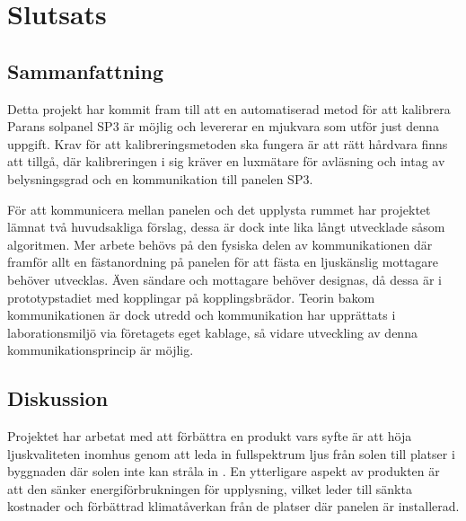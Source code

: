\section{Slutsats} %
\label{sec:slutsats}
    \subsection{Sammanfattning} %
    \label{sub:sammanfattning}
        Detta projekt har kommit fram till att en automatiserad metod för att kalibrera Parans solpanel SP3 är möjlig och levererar en mjukvara som utför just denna uppgift. Krav för att kalibreringsmetoden ska fungera är att rätt hårdvara finns att tillgå, där kalibreringen i sig kräver en luxmätare för avläsning och intag av belysningsgrad och en kommunikation till panelen SP3.\bigskip 

        För att kommunicera mellan panelen och det upplysta rummet har projektet lämnat två huvudsakliga förslag, dessa är dock inte lika långt utvecklade såsom algoritmen. Mer arbete behövs på den fysiska delen av kommunikationen där framför allt en fästanordning på panelen för att fästa en ljuskänslig mottagare behöver utvecklas. Även sändare och mottagare behöver designas, då dessa är i prototypstadiet med kopplingar på kopplingsbrädor. Teorin bakom kommunikationen är dock utredd och kommunikation har upprättats i laborationsmiljö via företagets eget kablage, så vidare utveckling av denna kommunikationsprincip är möjlig.

    \subsection{Diskussion} %
    \label{sub:diskussion}
        Projektet har arbetat med att förbättra en produkt vars syfte är att höja ljuskvaliteten inomhus genom att leda in fullspektrum ljus från solen till platser i byggnaden där solen inte kan stråla in \cite{quality}. En ytterligare aspekt av produkten är att den sänker energiförbrukningen för upplysning, vilket leder till sänkta kostnader och förbättrad klimatåverkan från de platser där panelen är installerad. \bigskip


